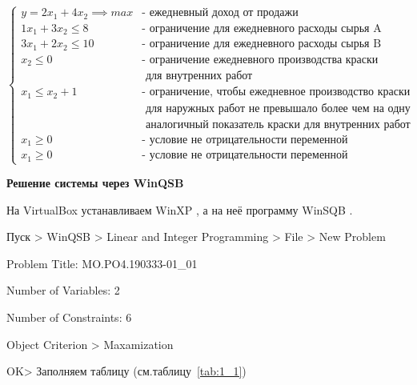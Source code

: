 $$
\begin{cases}
  y = 2 x_1 + 4 x_2 \implies max &\text{- ежедневный доход от продажи}\\
  1 x_1 + 3 x_2  \leq 8 &\text{- ограничение для ежедневного расходы сырья A}\\
  3 x_1 + 2 x_2 \leq 10 &\text{- ограничение для ежедневного расходы сырья B}\\
  x_2 \leq 0 &\text{- ограничение ежедневного производства краски}\\
  &\text{  для внутренних работ}\\
  x_1 \leq x_2 + 1 &\text{- ограничение, чтобы ежедневное производство краски}\\
  &\text{  для наружных работ не превышало более чем на одну тонну}\\
  &\text{  аналогичный показатель краски для внутренних работ}\\
  x_1 \geq 0&\text{- условие не отрицательности переменной}\\
  x_1 \geq 0&\text{- условие не отрицательности переменной}
\end{cases}
$$

\newpage

\begin{center}
\textbf{Решение системы через WinQSB}
\end{center}

На VirtualBox \cite{VirtualBox} устанавливаем WinXP \cite{WinXP}, а на неё программу WinSQB \cite{WinQSB}.

Пуск > WinQSB > Linear and Integer Programming > File > New Problem

Problem Title: MO.PO4.190333-01\_01

Number of Variables: 2

Number of Constraints: 6

Object Criterion > Maxamization

OK> Заполняем таблицу (см.таблицу~\ref{tab:1_1})


